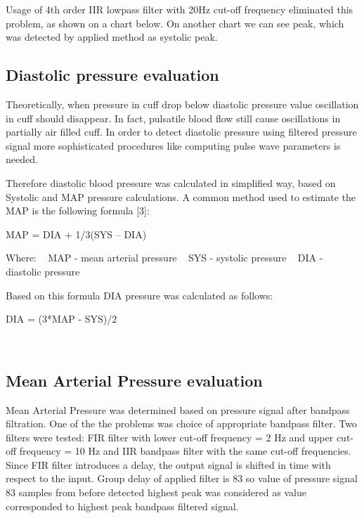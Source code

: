  Usage of 4th order I\+IR lowpass filter with 20Hz cut-\/off frequency eliminated this problem, as shown on a chart below.   On another chart we can see peak, which was detected by applied method as systolic peak.  \hypertarget{index_DIA_pressure_calc}{}\subsection{Diastolic pressure evaluation}\label{index_DIA_pressure_calc}
Theoretically, when pressure in cuff drop below diastolic pressure value oscillation in cuff should disappear. In fact, pulsatile blood flow still cause oscillations in partially air filled cuff. In order to detect diastolic pressure using filtered pressure signal more sophisticated procedures like computing pulse wave parameters is needed. 

Therefore diastolic blood pressure was calculated in simplified way, based on Systolic and M\+AP pressure calculations. A common method used to estimate the M\+AP is the following formula \mbox{[}3\mbox{]}\+: \begin{DoxyVerb}                       MAP = DIA + 1/3(SYS – DIA)
\end{DoxyVerb}
 Where\+: ~\newline
 M\+AP -\/ mean arterial pressure ~\newline
 S\+YS -\/ systolic pressure ~\newline
 D\+IA -\/ diastolic pressure

Based on this formula D\+IA pressure was calculated as follows\+: \begin{DoxyVerb}                       DIA = (3*MAP - SYS)/2
\end{DoxyVerb}


~\newline
\hypertarget{index_MAP_pressure_calc}{}\subsection{Mean Arterial Pressure evaluation}\label{index_MAP_pressure_calc}
Mean Arterial Pressure was determined based on pressure signal after bandpass filtration. One of the the problems was choice of appropriate bandpass filter. Two filters were tested\+: F\+IR filter with lower cut-\/off frequency = 2 Hz and upper cut-\/off frequency = 10 Hz and I\+IR bandpass filter with the same cut-\/off frequencies. Since F\+IR filter introduces a delay, the output signal is shifted in time with respect to the input. Group delay of applied filter is 83 so value of pressure signal 83 samples from before detected highest peak was considered as value corresponded to highest peak bandpass filtered signal.

